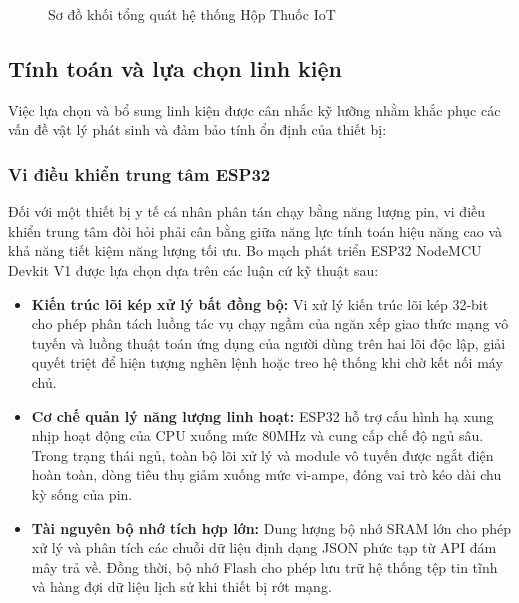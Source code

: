 \documentclass[12pt, a4paper, oneside]{article}
\begin{document}
\begin{figure}[H]
    \caption{Sơ đồ khối tổng quát hệ thống Hộp Thuốc IoT}
    \label{fig:so_do_khoi_tikz}
\end{figure}

\subsection{Tính toán và lựa chọn linh kiện}
Việc lựa chọn và bổ sung linh kiện được cân nhắc kỹ lưỡng nhằm khắc phục các vấn đề vật lý phát sinh và đảm bảo tính ổn định của thiết bị:
\subsubsection{Vi điều khiển trung tâm ESP32}
Đối với một thiết bị y tế cá nhân phân tán chạy bằng năng lượng pin, vi điều khiển trung tâm đòi hỏi phải cân bằng giữa năng lực tính toán hiệu năng cao và khả năng tiết kiệm năng lượng tối ưu. Bo mạch phát triển ESP32 NodeMCU Devkit V1 được lựa chọn dựa trên các luận cứ kỹ thuật sau:
\begin{itemize}
    \item \textbf{Kiến trúc lõi kép xử lý bất đồng bộ:} Vi xử lý kiến trúc lõi kép 32-bit cho phép phân tách luồng tác vụ chạy ngầm của ngăn xếp giao thức mạng vô tuyến và luồng thuật toán ứng dụng của người dùng trên hai lõi độc lập, giải quyết triệt để hiện tượng nghẽn lệnh hoặc treo hệ thống khi chờ kết nối máy chủ.
    \item \textbf{Cơ chế quản lý năng lượng linh hoạt:} ESP32 hỗ trợ cấu hình hạ xung nhịp hoạt động của CPU xuống mức 80MHz và cung cấp chế độ ngủ sâu. Trong trạng thái ngủ, toàn bộ lõi xử lý và module vô tuyến được ngắt điện hoàn toàn, dòng tiêu thụ giảm xuống mức vi-ampe, đóng vai trò kéo dài chu kỳ sống của pin.
    \item \textbf{Tài nguyên bộ nhớ tích hợp lớn:} Dung lượng bộ nhớ SRAM lớn cho phép xử lý và phân tích các chuỗi dữ liệu định dạng JSON phức tạp từ API đám mây trả về. Đồng thời, bộ nhớ Flash cho phép lưu trữ hệ thống tệp tin tĩnh và hàng đợi dữ liệu lịch sử khi thiết bị rớt mạng.
\end{itemize}
\end{document}
